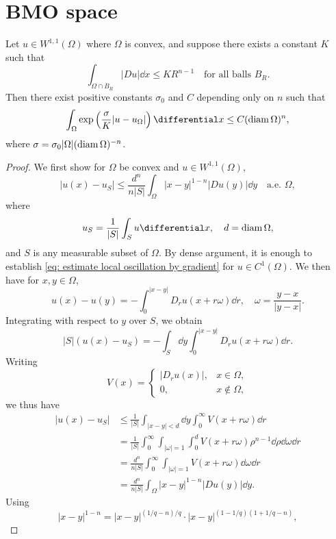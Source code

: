 \section{BMO space}
\begin{theorem}
	\label{thm: bmo estimates}
	Let $u\in W^{1,1}(\Omega)$ where $\Omega$ is convex, and suppose there exists a constant $K$ such that
	\[
		\int_{\Omega\cap B_R}|Du|\dd x \leq KR^{n-1}\quad\text{for all balls }B_R.
	\]
	Then there exist positive constants $\sigma_0$ and $C$ depending only on $n$ such that
	\[
		\int_\Omega \exp\left(\frac{\sigma}{K}|u-u_\Omega|\right)\dd x \leq C(\diam \Omega)^n,
	\]
	where $\sigma = \sigma_0|\Omega|(\operatorname*{diam} \Omega)^{-n}$.
\end{theorem}
\begin{proof}
	We first show for $\Omega$ be convex and $u\in W^{1,1}(\Omega)$, 
	\begin{equation}
		\label{eq: estimate local oscillation by gradient}
		|u(x) - u_S| \leq \frac{d^n}{n|S|}\int_\Omega|x-y|^{1-n}|Du(y)|\dd y\quad\text{a.e. }\Omega,
	\end{equation}
	where 
	\[
		u_S = \frac{1}{|S|}\int_S u\dd x,\quad d = \diam \Omega,
	\]
	and $S$ is any measurable subset of $\Omega$.
	By dense argument, it is enough to establish \eqref{eq: estimate local oscillation by gradient} for $u\in C^1(\Omega)$.
	We then have for $x,y\in\Omega$,
	\[
		u(x) - u(y) = - \int_0^{|x-y|} D_ru(x + r\omega)\dd r, \quad \omega = \frac{y-x}{|y-x|}.
	\]
	Integrating with respect to $y$ over $S$, we obtain
	\[
		|S|(u(x) - u_S) = - \int_S\dd y \int_0^{|x-y|}D_r u(x + r\omega)\dd r.
	\]
	Writing 
	\begin{equation*}
		V(x) = 
		\begin{cases}
			|D_ru(x)|, & x\in\Omega,\\
			0, & x\not\in\Omega,
		\end{cases}
	\end{equation*}
	we thus have 
	\begin{align*}
		|u(x) - u_S| 
		&\leq \frac{1}{|S|}\int_{|x-y|<d}\dd y \int_0^\infty V(x+r\omega)\dd r\\
		&= \frac{1}{|S|}\int_0^\infty\int_{|\omega|=1}\int_0^dV(x+r\omega)\rho^{n-1}\dd\rho\dd\omega\dd r\\
		&= \frac{d^n}{n|S|} \int_0^\infty\int_{|\omega|=1}V(x+r\omega)\dd\omega\dd r\\
		&= \frac{d^n}{n|S|} \int_\Omega |x-y|^{1-n}|Du(y)|\dd y.
	\end{align*}
	Using 
	\[
		|x-y|^{1-n} = |x-y|^{(1/q-n)/q} \cdot |x-y|^{(1-1/q)(1+1/q-n)},
\]
\end{proof}
